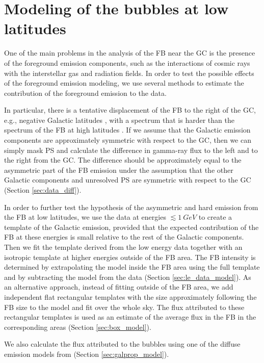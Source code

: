 
\section{Modeling of the \Fermi bubbles at low latitudes}
\label{sec:Modeling}
One of the main problems in the analysis of the FB near the GC is the 
presence of the foreground emission components, 
such as the interactions of cosmic rays with the interstellar gas and radiation fields.
In order to test the possible effects of the foreground emission modeling,
we use several methods to estimate the contribution of the foreground emission to the data.

In particular, there is a tentative
displacement of the FB to the right of the GC, e.g., negative Galactic latitudes \citep{2016ApJS..223...26A, 2017ApJ...840...43A},
with a spectrum that is harder than the spectrum of the FB at high latitudes \citep{2017ApJ...840...43A}.
If we assume that the Galactic emission components are approximately symmetric with respect to the GC,
then we can simply mask PS and calculate the difference in gamma-ray flux to the left and to the right from the GC.
The difference should be approximately equal to the asymmetric part of the FB emission
under the assumption that the other Galactic components and unresolved PS are symmetric with respect to the GC
(Section \ref{sec:data_diff}).

In order to further test the hypothesis of the asymmetric and hard emission from the FB at low latitudes,
we use the data at energies $\lesssim \SI{1}{GeV}$ to create a template of the Galactic emission,
provided that the expected contribution of the FB at these energies is small relative to the rest of the Galactic components.
Then we fit the template derived from the low energy data together with an isotropic template at higher energies
outside of the FB area.
The FB intensity is determined by extrapolating the model inside the FB area using the full template and by subtracting the model
from the data (Section \ref{sec:le_data_model}).
As an alternative approach, instead of fitting outside of the FB area, we add independent flat rectangular templates with the size
approximately following the FB size to the model and fit over the whole sky.
The flux attributed to these rectangular templates is used as an estimate of the average flux in the FB in the corresponding areas
(Section \ref{sec:box_model}).

We also calculate the flux attributed to the bubbles using one of the diffuse emission models from \citep{2017ApJ...840...43A}
(Section \ref{sec:galprop_model}).



